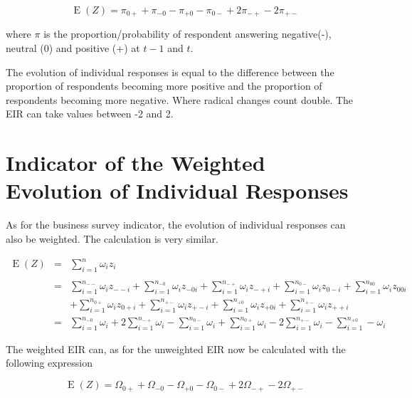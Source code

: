\documentclass[12pt,a4paper,oneside]{book}
\DeclareMathOperator{\E}{E}
\begin{document}
\begin{equation}
    \E(Z) = \pi_{0+} + \pi_{-0} - \pi_{+0} - \pi_{0-} +2\pi_{-+} -2\pi_{+-} \label{eq:unweighted proprotion EIR}
\end{equation}

where $\pi$ is the proportion/probability of respondent answering negative(-), neutral (0) and positive (+) at $t-1$ and $t$. 

The evolution of individual responses is equal to the difference between the proportion of respondents becoming more positive and the proportion of respondents becoming more negative. Where radical changes count double.
The EIR can take values between -2 and 2.


\section{Indicator of the Weighted Evolution of Individual Responses}

As for the business survey indicator, the evolution of individual responses can also be weighted. The calculation is very similar.

\begin{eqnarray}
    \E(Z) &=&  \sum_{i=1}^n \omega_i z_i \\ \nonumber \\
        &=& \sum_{i=1}^{n_{--}} \omega_i z_{--i} 
     + \sum_{i=1}^{n_{-0}} \omega_i z_{-0i}  
    + \sum_{i=1}^{n_{-+}} \omega_i z_{-+i} 
    + \sum_{i=1}^{n_{0-}} \omega_i z_{0-i}  
    + \sum_{i=1}^{n_{00}} \omega_i z_{00i}   \nonumber  \\
    &&  + \sum_{i=1}^{n_{0+}} \omega_i z_{0+i} 
    + \sum_{i=1}^{n_{+-}} \omega_i z_{+-i} 
    + \sum_{i=1}^{n_{+0}} \omega_i z_{+0i} 
    + \sum_{i=1}^{n_{+-}} \omega_i z_{++i} \\
&=&  \sum_{i=1}^{n_{-0}} \omega_i  
    + 2 \sum_{i=1}^{n_{-+}} \omega_i  
    - \sum_{i=1}^{n_{0-}} \omega_i         
    + \sum_{i=1}^{n_{0+}} \omega_i  
    - 2 \sum_{i=1}^{n_{+-}} \omega_i 
    - \sum_{i=1}^{n_{+0}} - \omega_i  
\end{eqnarray}

The weighted EIR can, as for the unweighted EIR now be calculated with the following expression 

\begin{equation}
    \E(Z) = \Omega_{0+} + \Omega_{-0} - \Omega_{+0} - \Omega_{0-} +2\Omega_{-+} -2\Omega_{+-} \label{eq:weighted proprotion EIR}
\end{equation}
\end{document}
